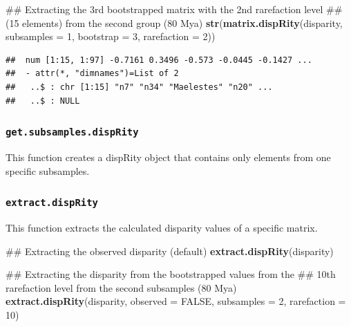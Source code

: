 \documentclass[]{book}
\newenvironment{Shaded}{\begin{snugshade}}{\end{snugshade}}
\newcommand{\KeywordTok}[1]{\textcolor[rgb]{0.13,0.29,0.53}{\textbf{#1}}}
\newcommand{\DataTypeTok}[1]{\textcolor[rgb]{0.13,0.29,0.53}{#1}}
\newcommand{\DecValTok}[1]{\textcolor[rgb]{0.00,0.00,0.81}{#1}}
\newcommand{\StringTok}[1]{\textcolor[rgb]{0.31,0.60,0.02}{#1}}
\newcommand{\OtherTok}[1]{\textcolor[rgb]{0.56,0.35,0.01}{#1}}
\newcommand{\OperatorTok}[1]{\textcolor[rgb]{0.81,0.36,0.00}{\textbf{#1}}}
\newcommand{\NormalTok}[1]{#1}
\theoremstyle{definition}
\theoremstyle{definition}
\theoremstyle{remark}
\begin{document}
\begin{Shaded}
\begin{Highlighting}[]
\NormalTok{## Extracting the 3rd bootstrapped matrix with the 2nd rarefaction level}
\NormalTok{## (15 elements) from the second group (80 Mya)}
\KeywordTok{str}\NormalTok{(}\KeywordTok{matrix.dispRity}\NormalTok{(disparity, }\DataTypeTok{subsamples =} \DecValTok{1}\NormalTok{, }\DataTypeTok{bootstrap =} \DecValTok{3}\NormalTok{, }\DataTypeTok{rarefaction =} \DecValTok{2}\NormalTok{))}
\end{Highlighting}
\end{Shaded}

\begin{verbatim}
##  num [1:15, 1:97] -0.7161 0.3496 -0.573 -0.0445 -0.1427 ...
##  - attr(*, "dimnames")=List of 2
##   ..$ : chr [1:15] "n7" "n34" "Maelestes" "n20" ...
##   ..$ : NULL
\end{verbatim}

\subsubsection{\texorpdfstring{\texttt{get.subsamples.dispRity}}{get.subsamples.dispRity}}\label{get.subsamples.disprity}

This function creates a dispRity object that contains only elements from
one specific subsamples.

\begin{Shaded}
\end{Shaded}

\subsubsection{\texorpdfstring{\texttt{extract.dispRity}}{extract.dispRity}}\label{extract.disprity}

This function extracts the calculated disparity values of a specific
matrix.

\begin{Shaded}
\begin{Highlighting}[]
\NormalTok{## Extracting the observed disparity (default)}
\KeywordTok{extract.dispRity}\NormalTok{(disparity)}

\NormalTok{## Extracting the disparity from the bootstrapped values from the}
\NormalTok{## 10th rarefaction level from the second subsamples (80 Mya)}
\KeywordTok{extract.dispRity}\NormalTok{(disparity, }\DataTypeTok{observed =} \OtherTok{FALSE}\NormalTok{, }\DataTypeTok{subsamples =} \DecValTok{2}\NormalTok{, }\DataTypeTok{rarefaction =} \DecValTok{10}\NormalTok{)}
\end{Highlighting}
\end{Shaded}
\end{document}
